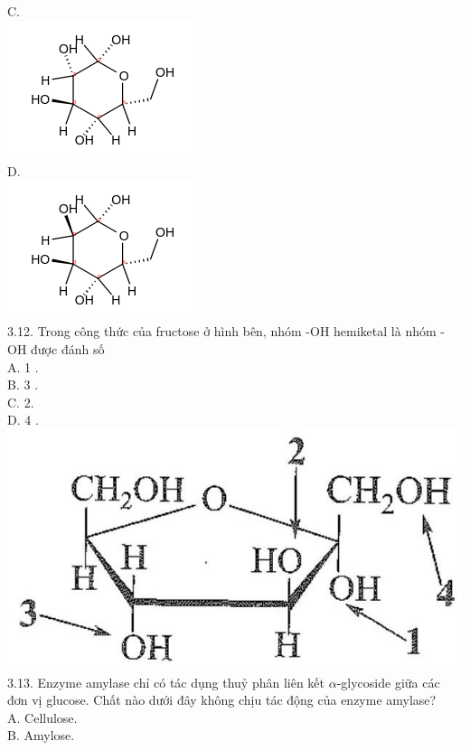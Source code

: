 \documentclass[10pt]{article}
\begin{document}
C.\\
\includegraphics{smile-a6ca58fbedc49696409071369c30f728f230008a}\\
D.\\
\includegraphics{smile-30b5312dcb266e6797c81b0ae8f1950700b64e16}\\
3.12. Trong công thức của fructose ở hình bên, nhóm -OH hemiketal là nhóm -OH được đánh số\\
A. 1 .\\
B. 3 .\\
C. 2.\\
D. 4 .\\
\includegraphics[max width=\textwidth, center]{2025_10_23_80c1361fcdcd395cad8eg-09}\\
3.13. Enzyme amylase chỉ có tác dụng thuỷ phân liên kết $\alpha$-glycoside giữa các đơn vị glucose. Chất nào dưới đây không chịu tác động của enzyme amylase?\\
A. Cellulose.\\
B. Amylose.\\
\end{document}
